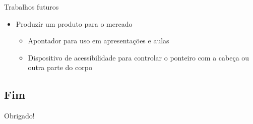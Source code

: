 \documentclass{beamer}
\begin{document}
\begin{frame}{Trabalhos futuros}
	\begin{itemize}
	\pause
	\item Produzir um produto para o mercado
		\begin{itemize}
		\pause
		\item Apontador para uso em apresentações e aulas
		\pause
		\item Dispositivo de acessibilidade para controlar o ponteiro com a cabeça ou outra parte do corpo
		\end{itemize}
	\end{itemize}
\end{frame}


\subsection{Fim}

\begin{frame}{}
	\begin{center}
	\Large{Obrigado!}
	\end{center}
\end{frame}
\end{document}
